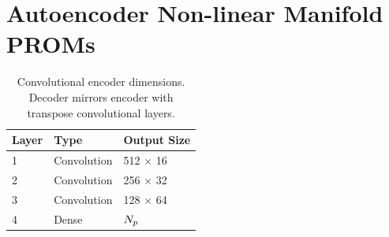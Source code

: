 \section{Autoencoder Non-linear Manifold PROMs}

\begin{table}
	\centering
	\begin{tabular}{ lll }
	\toprule
	Layer & Type & Output Size  \\
	\midrule
	1 & Convolution & 512 $\times$ 16 \\
    2 & Convolution & 256 $\times$ 32 \\
    3 & Convolution & 128 $\times$ 64 \\
    4 & Dense & $N_p$ \\
	\bottomrule
	\end{tabular}
	\caption{\label{tab:caeArch}Convolutional encoder dimensions. Decoder mirrors encoder with transpose convolutional layers.}
\end{table}

